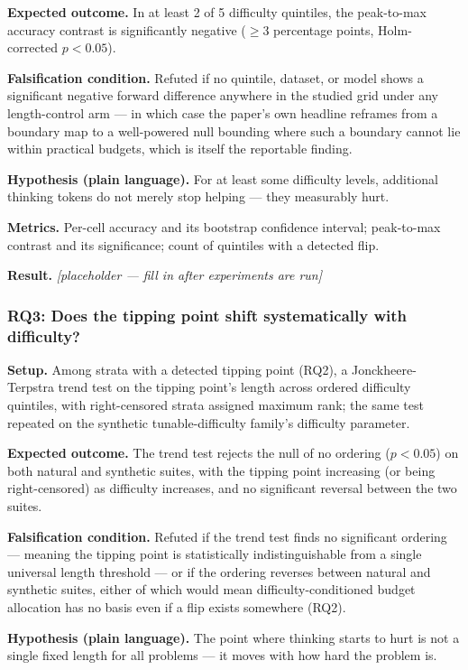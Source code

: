 \documentclass[11pt]{article}
\newcommand{\ph}{\textit{[placeholder --- fill in after experiments are run]}}
\begin{document}
\textbf{Expected outcome.} In at least 2 of 5 difficulty quintiles, the peak-to-max accuracy contrast is significantly negative ($\geq$3 percentage points, Holm-corrected $p < 0.05$).

\textbf{Falsification condition.} Refuted if no quintile, dataset, or model shows a significant negative forward difference anywhere in the studied grid under any length-control arm --- in which case the paper's own headline reframes from a boundary map to a well-powered null bounding where such a boundary cannot lie within practical budgets, which is itself the reportable finding.

\textbf{Hypothesis (plain language).} For at least some difficulty levels, additional thinking tokens do not merely stop helping --- they measurably hurt.

\textbf{Metrics.} Per-cell accuracy and its bootstrap confidence interval; peak-to-max contrast and its significance; count of quintiles with a detected flip.

\textbf{Result.} \ph

\subsubsection{RQ3: Does the tipping point shift systematically with difficulty?}
\textbf{Setup.} Among strata with a detected tipping point (RQ2), a Jonckheere-Terpstra trend test on the tipping point's length across ordered difficulty quintiles, with right-censored strata assigned maximum rank; the same test repeated on the synthetic tunable-difficulty family's difficulty parameter.

\textbf{Expected outcome.} The trend test rejects the null of no ordering ($p < 0.05$) on both natural and synthetic suites, with the tipping point increasing (or being right-censored) as difficulty increases, and no significant reversal between the two suites.

\textbf{Falsification condition.} Refuted if the trend test finds no significant ordering --- meaning the tipping point is statistically indistinguishable from a single universal length threshold --- or if the ordering reverses between natural and synthetic suites, either of which would mean difficulty-conditioned budget allocation has no basis even if a flip exists somewhere (RQ2).

\textbf{Hypothesis (plain language).} The point where thinking starts to hurt is not a single fixed length for all problems --- it moves with how hard the problem is.
\end{document}
